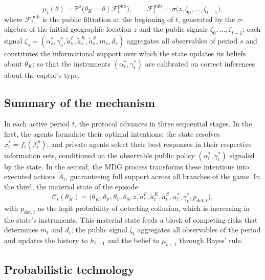\documentclass[ecta,nameyear,draft]{econsocart}
\theoremstyle{plain}
\theoremstyle{definition}
\newcommand{\Prob}{\mathbb{P}}
\newcommand{\1}{\mathbf{1}}
\begin{document}
\[
\mu_t(\theta)=\Prob^s\!\bigl(\theta_K=\theta\mid\mathcal{F}_t^{\mathrm{pub}}\bigr),\qquad \mathcal{F}_t^{\mathrm{pub}}=\sigma\bigl(z,\zeta_0,\ldots,\zeta_{t-1}\bigr),
\]
where $\mathcal{F}_t^{\mathrm{pub}}$ is the public filtration at the beginning of $t$, generated by the $\sigma$-algebra of the initial geographic location $z$ and the public signals $\zeta_0,\ldots,\zeta_{t-1}$; each signal $\zeta_s=(\alpha_s^\ast,\gamma_s^\ast,\tilde{a}_s^F,\tilde{a}_s^K,\tilde{a}_s^S,m_s,d_s)$ aggregates all observables of period $s$ and constitutes the informational support over which the state updates its beliefs about $\theta_K$; so that the instruments $(\alpha_t^\ast,\gamma_t^\ast)$ are calibrated on correct inferences about the captor's type.

\subsection{Summary of the mechanism}\label{subsec:resumen-mecanismo}

In each active period $t$, the protocol advances in three sequential stages. In the first, the agents formulate their optimal intentions: the state resolves $x_t^\ast=f_t(\mathcal{I}_t^S)$, and private agents select their best responses in their respective information sets, conditioned on the observable public policy $(\alpha_t^\ast,\gamma_t^\ast)$ signaled by the state. In the second, the MDG process transforms these intentions into executed actions $\tilde{A}_t$, guaranteeing full support across all branches of the game. In the third, the material state of the episode
\[
\mathcal{C}_t(\theta_K)=\bigl(\theta_K,\theta_F,\theta_V,\theta_S,z,\tilde{a}_t^F,\tilde{a}_t^K,\tilde{a}_t^S,\alpha_t^\ast,\gamma_t^\ast,p_{\mathrm{det},t}\bigr),
\]
with $p_{\mathrm{det},t}$ as the logit probability of detecting collusion, which is increasing in the state's instruments. This material state feeds a block of competing risks that determines $m_t$ and $d_t$; the public signal $\zeta_t$ aggregates all observables of the period and updates the history to $h_{t+1}$ and the belief to $\mu_{t+1}$ through Bayes' rule.

\subsection{Probabilistic technology}\label{subsec:prob-tech}
\end{document}
